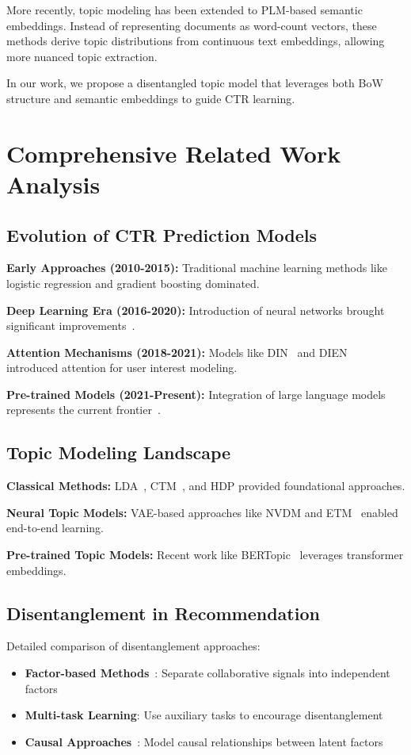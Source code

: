 More recently, topic modeling has been extended to PLM-based semantic embeddings. Instead of representing documents as word-count vectors, these methods derive topic distributions from continuous text embeddings, allowing more nuanced topic extraction.

In our work, we propose a disentangled topic model that leverages both BoW structure and semantic embeddings to guide CTR learning.

\section{Comprehensive Related Work Analysis}

\subsection{Evolution of CTR Prediction Models}
\textbf{Early Approaches (2010-2015):} Traditional machine learning methods like logistic regression and gradient boosting dominated.

\textbf{Deep Learning Era (2016-2020):} Introduction of neural networks brought significant improvements~\cite{guo2017deepfm}.

\textbf{Attention Mechanisms (2018-2021):} Models like DIN~\cite{zhou2018deep} and DIEN~\cite{zhou2019deep} introduced attention for user interest modeling.

\textbf{Pre-trained Models (2021-Present):} Integration of large language models represents the current frontier~\cite{wang2023bert4ctr}.

\subsection{Topic Modeling Landscape}
\textbf{Classical Methods:} LDA~\cite{blei2003latent}, CTM~\cite{blei2006dynamic}, and HDP provided foundational approaches.

\textbf{Neural Topic Models:} VAE-based approaches like NVDM and ETM~\cite{dieng2020topic} enabled end-to-end learning.

\textbf{Pre-trained Topic Models:} Recent work like BERTopic~\cite{grootendorst2022bertopic} leverages transformer embeddings.

\subsection{Disentanglement in Recommendation}
Detailed comparison of disentanglement approaches:
\begin{itemize}
    \item \textbf{Factor-based Methods}~\cite{ma2019learning}: Separate collaborative signals into independent factors
    \item \textbf{Multi-task Learning}: Use auxiliary tasks to encourage disentanglement
    \item \textbf{Causal Approaches}~\cite{yang2021causalvae}: Model causal relationships between latent factors
\end{itemize}

